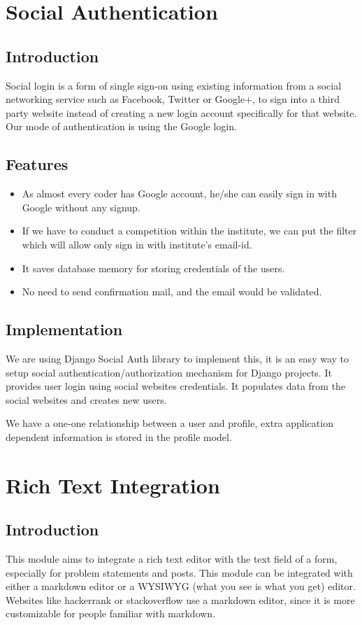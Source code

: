 \section{Social Authentication}
\subsection{Introduction}
Social login is a form of single sign-on using existing information from a social networking service such as Facebook, Twitter or Google+, to sign into a third party website instead of creating a new login account specifically for that website.
Our mode of authentication is using the Google login.
\subsection{Features}
\begin{itemize}
	\item As almost every coder has Google account, he/she can easily sign in with Google without any signup.
	\item If we have to conduct a competition within the institute, we can put the filter which will allow only sign in with institute’s email-id.
	\item It saves database memory for storing credentials of the users.
	\item No need to send confirmation mail, and the email would be validated.

\end{itemize}
\subsection{Implementation}
We are using Django Social Auth library to implement this, it is an easy way to setup social authentication/authorization mechanism for Django projects. It provides user login using social websites credentials. It populates data from the social websites and creates new users.

We have a one-one relationship between a user and profile, extra application dependent information is stored in the profile model.


\section{Rich Text Integration}
\subsection{Introduction}
This module aims to integrate a rich text editor with the text field of a form, especially for problem statements and posts. This module can be integrated with either a markdown editor or a WYSIWYG (what you see is what you get) editor. Websites like hackerrank or stackoverflow use a markdown editor, since it is more customizable for people familiar with markdown.

